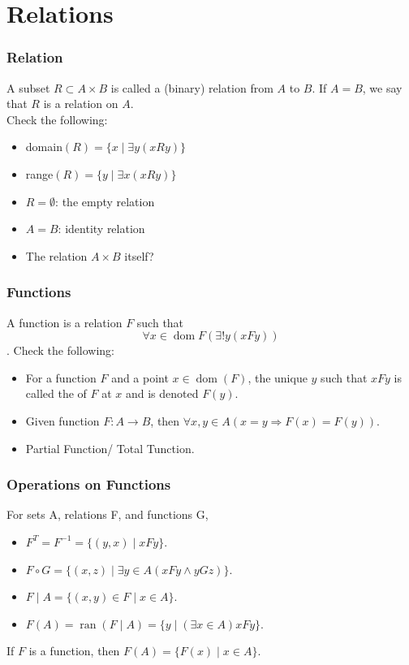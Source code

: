 \documentclass{beamer}
\begin{document}
\section{Relations}
\begin{frame}
    \frametitle{Relation}
    \hh A subset $R \subset A \times B$ is called a (binary) relation from $A$ to $B$. 
    If $A = B$,	we say that $R$ is a relation on $A$.\\ 
	\vv
    Check the following:
    \begin{itemize}
        \item domain$(R)=\{x \mid \exists y(x R y)\}$
        \item range$(R)=\{y \mid \exists x(x R y)\}$
        \item $R = \emptyset$: the empty relation
        \item $A = B$: identity relation
        \item The relation $A \times B$ itself? 
    \end{itemize}
\end{frame}
\begin{frame}
    \frametitle{Functions}
    \hh A function is a relation $F$ such that $$\forall x \in \operatorname{dom} F(\exists ! y(x F y))$$.
	Check the following:
    \begin{itemize}
        \item  For a function $F$ and a point $x \in \operatorname{dom} (F)$, the unique $y$ such that $xFy$ is called the  of $F$ at $x$ and is denoted $F(y)$. 
        \item Given function $F : A \to B$, then $\forall x, y \in A(x = y \Rightarrow F(x) = F(y))$.
        \item Partial Function/ Total Tunction.
    \end{itemize}
\end{frame}
\begin{frame}
    \frametitle{Operations on Functions}
    \par For  sets A, relations F, and functions G,
	\vv
    \begin{itemize}
		\item {} $F^T = F^{-1} = \{(y, x) \mid xFy\}$.
        \item {} $F \circ G = \{(x, z) \mid \exists y \in A(xFy \wedge yGz)\}$.
		\item {} $F \mid A = \{(x, y) \in F \mid x \in A \}$.
		\item {} $F(A) = \operatorname{ran}(F \mid A) = \{y \mid (\exists x \in A) xFy \}$. 
	\end{itemize}
    \vv
    If $F$ is a function, then $F(A) = \{F(x) \mid x \in A\}$.
\end{frame}
\end{document}
